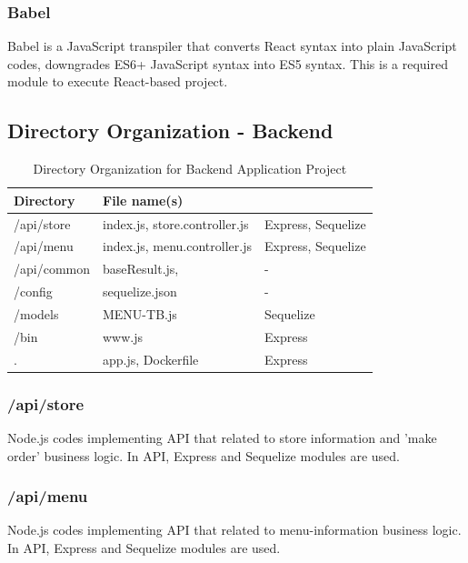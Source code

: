 \documentclass[conference,compsoc]{IEEEtran}
\begin{document}
\subsubsection{Babel}
Babel is a JavaScript transpiler that converts React syntax into plain JavaScript codes, downgrades ES6+ JavaScript syntax into ES5 syntax. This is a required module to execute React-based project.


\subsection{Directory Organization - Backend}
\begin{table}[ht!] \renewcommand\arraystretch{1.25}
  \begin{threeparttable}
    \caption{Directory Organization for Backend Application Project%
    \label{tab:table6}}    %
    \begin{tabular}{@{}l l>{\raggedright\arraybackslash}p{3.2cm}@{}}
    \toprule
    \bfseries Directory & \bfseries File name(s) & \multicolumn{1}{l}{\bfseries Modules used} \\
    \midrule
      /api/store &	index.js, store.controller.js	& Express, Sequelize \\
      /api/menu &	index.js, menu.controller.js	& Express, Sequelize \\
      /api/common & baseResult.js, & - \\
      /config & sequelize.json & - \\
      /models & MENU-TB.js & Sequelize \\
      /bin	& www.js	& Express \\
      .	& app.js, Dockerfile	& Express \\
      \bottomrule
      \end{tabular}
  \end{threeparttable}
\end{table}

\subsubsection{/api/store}
Node.js codes implementing API that related to store information and 'make order' business logic. In API, Express and Sequelize modules are used.

\subsubsection{/api/menu} 
Node.js codes implementing API that related to menu-information business logic. In API, Express and Sequelize modules are used.
\end{document}
